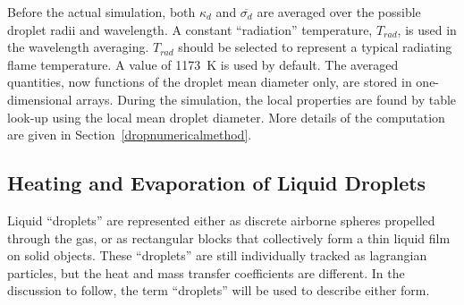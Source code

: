 \documentclass[11pt]{book}
\begin{document}
Before the actual simulation, both $\kappa_d$ and
$\overline{\sigma_d}$ are averaged over the possible droplet radii and
wavelength.  A constant ``radiation'' temperature, $T_{rad}$, is used
in the wavelength averaging.  $T_{rad}$ should be selected to
represent a typical radiating flame temperature. A value of 1173~K is
used by default.  The averaged quantities, now functions of the
droplet mean diameter only, are stored in one-dimensional arrays.
During the simulation, the local properties are found by table
look-up using the local mean droplet diameter.  More details of the
computation are given in Section~\ref{dropnumericalmethod}.



\subsection{Heating and Evaporation of Liquid Droplets}

Liquid ``droplets'' are represented either as discrete airborne spheres propelled through the gas, or as rectangular blocks that collectively form a thin liquid film on solid objects.
These ``droplets'' are still individually tracked as
lagrangian particles, but the heat and mass transfer coefficients are different. In the discussion to follow, the term ``droplets'' will be used to describe either form.
\end{document}
